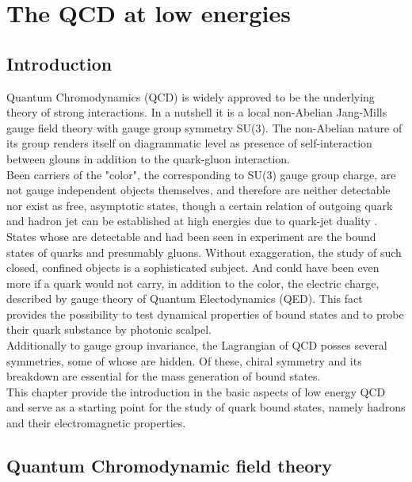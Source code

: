 \chapter{The QCD at low energies}
\label{chap:QCD_low}

\section{Introduction}
Quantum Chromodynamics (QCD) is widely approved to be the underlying theory of strong interactions. In a nutshell it is a local non-Abelian Jang-Mills gauge field theory with gauge group symmetry SU(3). The non-Abelian nature of its group renders itself on diagrammatic level as presence of self-interaction between glouns in addition to the quark-gluon interaction. \\

Been carriers of the "color", the corresponding to SU(3) gauge group charge, are not gauge independent objects themselves, and therefore are neither detectable nor exist as free, asymptotic states, though a certain relation of outgoing quark and hadron jet can be established at high energies due to quark-jet duality \cite{--}. States whose are detectable and had been seen in experiment are the bound states of quarks and presumably gluons. Without exaggeration, the study of such closed, confined objects is a sophisticated subject. And could have been even more if a quark would not carry, in addition to the color, the electric charge, described by gauge theory of Quantum Electodynamics (QED). This fact provides the possibility to test dynamical properties of bound states and to probe their quark substance by photonic scalpel. \\

Additionally to gauge group invariance, the Lagrangian of QCD posses several symmetries, some of whose are hidden. Of these, chiral symmetry and its breakdown are essential for the mass generation of bound states. \\

This chapter provide the introduction in the basic aspects of low energy QCD and serve as a starting point for the study of quark bound states, namely hadrons and their electromagnetic properties.



\section{Quantum Chromodynamic field theory}
